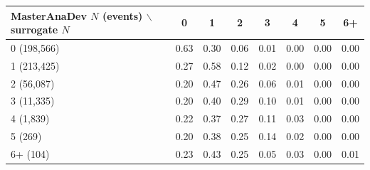 \begin{tabular}{lccccccc}
\toprule
MasterAnaDev $N$ (events) $\backslash$ surrogate $N$ & 0 & 1 & 2 & 3 & 4 & 5 & 6+ \\
\midrule
0 (198,566) & 0.63 & 0.30 & 0.06 & 0.01 & 0.00 & 0.00 & 0.00 \\
1 (213,425) & 0.27 & 0.58 & 0.12 & 0.02 & 0.00 & 0.00 & 0.00 \\
2 (56,087) & 0.20 & 0.47 & 0.26 & 0.06 & 0.01 & 0.00 & 0.00 \\
3 (11,335) & 0.20 & 0.40 & 0.29 & 0.10 & 0.01 & 0.00 & 0.00 \\
4 (1,839) & 0.22 & 0.37 & 0.27 & 0.11 & 0.03 & 0.00 & 0.00 \\
5 (269) & 0.20 & 0.38 & 0.25 & 0.14 & 0.02 & 0.00 & 0.00 \\
6+ (104) & 0.23 & 0.43 & 0.25 & 0.05 & 0.03 & 0.00 & 0.01 \\
\bottomrule
\end{tabular}
